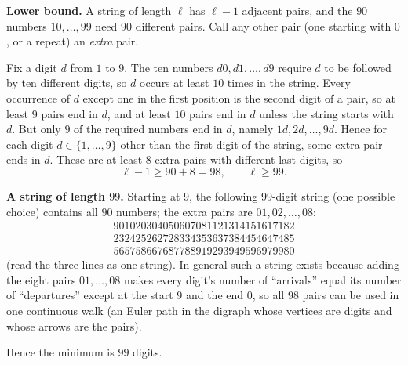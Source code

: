 \textbf{Lower bound.} A string of length $\ell$ has $\ell-1$ adjacent pairs, and the $90$ numbers $10,\dots,99$ need $90$ different pairs. Call any other pair (one starting with $0$, or a repeat) an \emph{extra} pair.

Fix a digit $d$ from $1$ to $9$. The ten numbers $d0,d1,\dots,d9$ require $d$ to be followed by ten different digits, so $d$ occurs at least $10$ times in the string. Every occurrence of $d$ except one in the first position is the second digit of a pair, so at least $9$ pairs end in $d$, and at least $10$ pairs end in $d$ unless the string starts with $d$. But only $9$ of the required numbers end in $d$, namely $1d,2d,\dots,9d$. Hence for each digit $d\in\{1,\dots,9\}$ other than the first digit of the string, some extra pair ends in $d$. These are at least $8$ extra pairs with different last digits, so
\[
\ell-1\ge90+8=98,\qquad \ell\ge99 .
\]

\textbf{A string of length $99$.} Starting at $9$, the following $99$-digit string (one possible choice) contains all $90$ numbers; the extra pairs are $01,02,\dots,08$:
\[
\begin{array}{l}
901020304050607081121314151617182\\
232425262728334353637384454647485\\
565758667687788919293949596979980
\end{array}
\]
(read the three lines as one string).
In general such a string exists because adding the eight pairs $01,\dots,08$ makes every digit's number of ``arrivals'' equal its number of ``departures'' except at the start $9$ and the end $0$, so all $98$ pairs can be used in one continuous walk (an Euler path in the digraph whose vertices are digits and whose arrows are the pairs).

Hence the minimum is $\boxed{99}$ digits.
